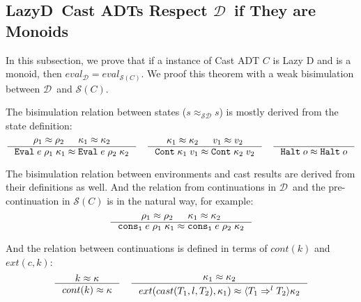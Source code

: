 \documentclass[acmsmall,review,anonymous]{acmart}\settopmatter{printfolios=true,printccs=false,printacmref=false}
\newcommand{\lazyD}{Lazy\;D}
\newcommand{\sOOinspect}[3]{\mathtt{Eval} \; #1 \; #2 \; #3}
\newcommand{\sOOreturn}[2]{\mathtt{Cont} \; #2 \; #1}
\newcommand{\sOOhalt}[1]{\mathtt{Halt} \; #1}
\newcommand{\cOOcast}[3]{#1 \Rightarrow^{#2} #3}
\newcommand{\kOOconsI}[3]{\mathtt{cons_1} \; #1 \; #2 \; #3}
\newcommand{\kOOcast}[2]{
	\langle #1 \rangle #2}
\newcommand{\eqvSD}[3]{#2 \approx_{\mathcal{SD}} #3}
\newcommand{\ineffCEKD}{$ \mathcal{D} $}
\newcommand{\effCEK}[1]{$ \mathcal{S}(#1) $}
\begin{document}
\subsection{\lazyD\ Cast ADTs Respect \ineffCEKD\ if They are 
Monoids}
\label{secc:framework:monoid-correct}

In this subsection, we prove that if a instance of Cast ADT $ C $ is Lazy D and 
is a monoid, then $ eval_\mathcal{D} = eval_{\mathcal{S}(C)} $. We proof this 
theorem with a weak bisimulation between \ineffCEKD\ and 
\effCEK{C}. 

The bisimulation relation between states ($\eqvSD{C}{s}{s}$) is mostly derived 
from the state definition: \begin{gather*}
\inference{
	\rho_1 \approx \rho_2 &
	\kappa_1 \approx \kappa_2
}{
	\sOOinspect{e}{\rho_1}{\kappa_1} \approx \sOOinspect{e}{\rho_2}{\kappa_2}
}
\quad
\inference{
	\kappa_1 \approx \kappa_2 &
	v_1 \approx v_2
}{
	\sOOreturn{v_1}{\kappa_1} \approx \sOOreturn{v_2}{\kappa_2}
}
\quad
\inference{
}{
	\sOOhalt{o} \approx \sOOhalt{o}
}
\end{gather*}

The bisimulation relation between environments and cast results are derived 
from their definitions as well. And the relation from continuations in 
\ineffCEKD\ and the pre-continuation in \effCEK{C} is in the natural way, for 
example: \begin{gather*}
\inference{
	\rho_1 \approx \rho_2 &
	\kappa_1 \approx \kappa_2
}{
	\kOOconsI{e}{\rho_1}{\kappa_1} \approx \kOOconsI{e}{\rho_2}{\kappa_2}
}
\end{gather*}

And the relation between continuations is defined in terms of $ cont(k) $ and $ 
ext(c,k) $: \begin{gather*}
\inference{
	k \approx \kappa
}{
	cont(k) \approx \kappa
}
\quad
\inference{
	\kappa_1 \approx \kappa_2
}{
	ext(cast(T_1,l,T_2),\kappa_1)
	\approx
	\kOOcast{\cOOcast{T_1}{l}{T_2}}{\kappa_2} 
}
\end{gather*}
\end{document}
